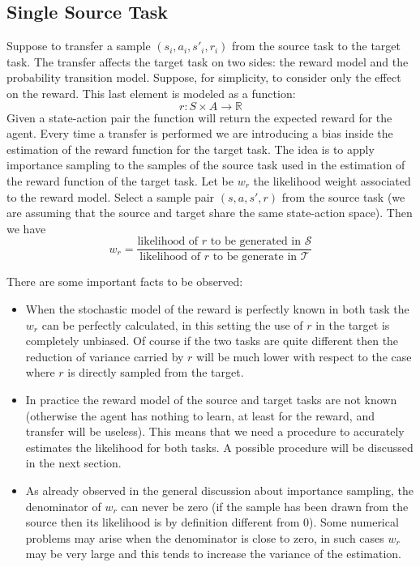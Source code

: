 \subsection{Single Source Task}
  \noindent Suppose to transfer a sample $(s_{i}, a_{i}, s'_{i}, r_{i})$ from the source task to the target task. The transfer
  affects the target task on two sides: the reward model and the probability transition model. \newline
  Suppose, for simplicity, to consider only the effect on the reward. This last element is modeled as a function:
  \begin{equation}
    r: S \times A \rightarrow \mathbb{R}
  \end{equation}
  \noindent Given a state-action pair the function will return the expected reward for the agent. Every time a transfer
  is performed we are introducing a bias inside the estimation of the reward function for the target task.\newline
  The idea is to apply importance sampling to the samples of the source task used in the estimation of the reward function
  of the target task. Let be $w_r$ the likelihood weight associated to the reward model. Select a sample pair $(s,a,s',r)$ from
  the source task (we are assuming that the source and target share the same state-action space). Then we have
  \begin{equation}
    w_{r} = \frac{\text{likelihood of $r$ to be generated in }\mathcal{S}}{\text{likelihood of $r$ to be generate in }\mathcal{T}}
  \end{equation}

  \noindent There are some important facts to be observed:
  \begin{itemize}
    \item When the stochastic model of the reward is perfectly known in both task
      the $w_r$ can be perfectly calculated, in this setting the use of $r$ in the
      target is completely unbiased. Of course if the two tasks are quite different
      then the reduction of variance carried by $r$ will be much lower with respect to
      the case where $r$ is directly sampled from the target.

    \item In practice the reward model of the source and target tasks are not known
      (otherwise the agent has nothing to learn, at least for the reward, and transfer will
      be useless). This means that we need a procedure to accurately estimates the likelihood
      for both tasks. A possible procedure will be discussed in the next section.

    \item As already observed in the general discussion about importance sampling, the
      denominator of $w_r$ can never be zero (if the sample has been drawn from the source
      then its likelihood is by definition different from 0). Some numerical problems may arise
      when the denominator is close to zero, in such cases $w_r$ may be very large and this
      tends to increase the variance of the estimation.
  \end{itemize}

